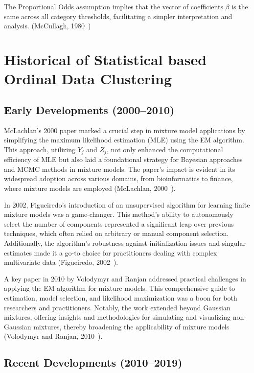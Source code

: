 \documentclass{article}
\begin{document}
The Proportional Odds assumption implies that the vector of coefficients $\beta$ is the same across all category thresholds, facilitating a simpler interpretation and analysis. (McCullagh, 1980~\cite{mccullagh1980regression})

\section{Historical of Statistical based Ordinal Data Clustering}

\subsection*{Early Developments (2000--2010)}

McLachlan's 2000 paper marked a crucial step in mixture model applications by simplifying the maximum likelihood estimation (MLE) using the EM algorithm. This approach, utilizing $Y_j$ and $Z_j$, not only enhanced the computational efficiency of MLE but also laid a foundational strategy for Bayesian approaches and MCMC methods in mixture models. The paper’s impact is evident in its widespread adoption across various domains, from bioinformatics to finance, where mixture models are employed (McLachlan, 2000~\cite{mclachlan2000finite}).

In 2002, Figueiredo's introduction of an unsupervised algorithm for learning finite mixture models was a game-changer. This method's ability to autonomously select the number of components represented a significant leap over previous techniques, which often relied on arbitrary or manual component selection. Additionally, the algorithm's robustness against initialization issues and singular estimates made it a go-to choice for practitioners dealing with complex multivariate data (Figueiredo, 2002~\cite{figueiredo2002unsupervised}).

A key paper in 2010 by Volodymyr and Ranjan addressed practical challenges in applying the EM algorithm for mixture models. This comprehensive guide to estimation, model selection, and likelihood maximization was a boon for both researchers and practitioners. Notably, the work extended beyond Gaussian mixtures, offering insights and methodologies for simulating and visualizing non-Gaussian mixtures, thereby broadening the applicability of mixture models (Volodymyr and Ranjan, 2010~\cite{10.1214/09-SS053}).

\subsection*{Recent Developments (2010--2019)}
\end{document}
